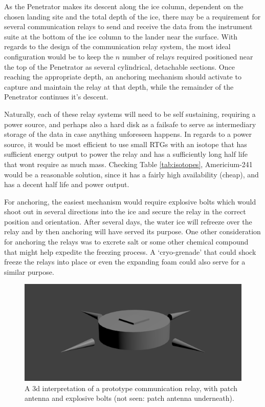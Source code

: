 
As the Penetrator makes its descent along the ice column, dependent on the chosen landing site and the total depth of the ice, there may be a requirement for several communication relays to send and receive the data from the instrument suite at the bottom of the ice column to the lander near the surface. With regards to the design of the communication relay system, the most ideal configuration would be to keep the $n$ number of relays required positioned near the top of the Penetrator as several cylindrical, detachable sections. Once reaching the appropriate depth, an anchoring mechanism should activate to capture and maintain the relay at that depth, while the remainder of the Penetrator continues it's descent.

Naturally, each of these relay systems will need to be self sustaining, requiring a power source, and perhaps also a hard disk as a failsafe to serve as intermediary storage of the data in case anything unforeseen happens. In regards to a power source, it would be most efficient to use small RTGs with an isotope that has sufficient energy output to power the relay and has a sufficiently long half life that wont require as much mass. Checking Table \ref{tab:isotopes}, Americium-241 would be a reasonable solution, since it has a fairly high availability (cheap), and has a decent half life and power output.

For anchoring, the easiest mechanism would require explosive bolts which would shoot out in several directions into the ice and secure the relay in the correct position and orientation. After several days, the water ice will refreeze over the relay and by then anchoring will have served its purpose. One other consideration for anchoring the relays was to excrete salt or some other chemical compound that might help expedite the freezing process. A `cryo-grenade' that could shock freeze the relays into place or even the expanding foam could also serve for a similar purpose.

\begin{figure}[h!]
	\begin{center}
		\includegraphics[width=0.7\columnwidth]{figures/JP/comms_relay.png}
		\caption{A 3d interpretation of a prototype communication relay, with patch antenna and explosive bolts (not seen: patch antenna underneath).\label{fig:comms_relay}}
	\end{center}
\end{figure}

